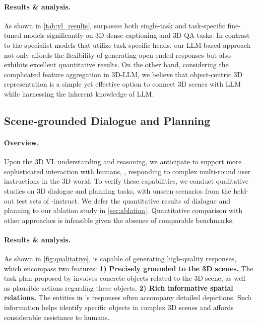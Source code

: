 \documentclass{article}
\begin{document}
    
    
    

    
    



\paragraph{Results \& analysis.} As shown in \cref{tab:vl_results}, \agent surpasses both \sota single-task and task-specific fine-tuned models significantly on 3D dense captioning and 3D QA tasks. In contrast to the specialist models that utilize task-specific heads, our LLM-based approach not only affords the flexibility of generating open-ended responses but also exhibits excellent quantitative results. On the other hand, considering the complicated feature aggregation in 3D-LLM, we believe that object-centric 3D representation is a simple yet effective option to connect 3D scenes with LLM while harnessing the inherent knowledge of LLM.

\vspace{-0.3em}
\subsection{Scene-grounded Dialogue and Planning}\label{sec:exp_dialog}

\paragraph{Overview.} Upon the 3D VL understanding and reasoning, we anticipate \agent to support more sophisticated interaction with humans, \eg, responding to complex multi-round user instructions in the 3D world. To verify these capabilities, we conduct qualitative studies on 3D dialogue and planning tasks, with unseen scenarios from the held-out test sets of \agent-instruct. We defer the quantitative results of dialogue and planning to our ablation study in \cref{sec:ablation}. Quantitative comparison with other approaches is infeasible given the absence of comparable benchmarks.

\paragraph{Results \& analysis.} As shown in \cref{fig:qualitative}, \agent is capable of generating high-quality responses, which encompass two features: \textbf{1) Precisely grounded to the 3D scenes.} The task plan proposed by \agent involves concrete objects related to the 3D scene, as well as plausible actions regarding these objects. \textbf{2) Rich informative spatial relations.} The entities in \agent's responses often accompany detailed depictions. Such information helps identify specific objects in complex 3D scenes and affords considerable assistance to humans.
\end{document}
